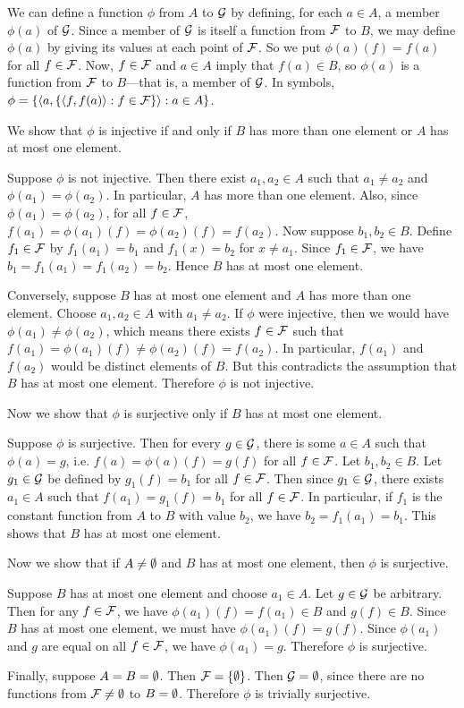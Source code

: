 \begin{solution}
We can define a function $\phi$ from $A$ to $\mathcal{G}$ by defining, for each $a\in A$,
a member $\phi(a)$ of $\mathcal{G}$. Since a member of $\mathcal{G}$ is itself a function from $\mathcal{F}$
to $B$, we may define $\phi(a)$ by giving its values at each point of $\mathcal{F}$.
So we put $\phi(a)(f) = f(a)$ for all $f\in \mathcal{F}$. Now, $f\in\mathcal{F}$
and $a\in A$ imply that $f(a)\in B$, so $\phi(a)$ is a function from $\mathcal{F}$ to $B$---that is, a member of $\mathcal{G}$.
In symbols, $\phi = \left\{ \left\langle a, \left\{ \left\langle f, f(a)\right\rangle : f\in \mathcal{F} \right\}\right\rangle : a\in A \right\}$.

We show that $\phi$ is injective if and only if $B$ has more than one element or $A$ has at most one element.

Suppose $\phi$ is not injective. Then there exist $a_1,a_2\in A$ such that $a_1\neq a_2$ and
$\phi(a_1)= \phi(a_2)$. In particular, $A$ has more than one element.
Also, since $\phi(a_1)= \phi(a_2)$, for all $f\in\mathcal{F}$, $f(a_1)=\phi(a_1)(f)=\phi(a_2)(f)=f(a_2)$.
Now suppose $b_1,b_2\in B$. Define $f_1\in\mathcal{F}$ by $f_1(a_1)=b_1$ and $f_1(x)=b_2$ for $x\neq a_1$.
Since $f_1\in\mathcal{F}$, we have $b_1=f_1(a_1)=f_1(a_2)=b_2$. Hence $B$ has at most one element.

Conversely, suppose $B$ has at most one element and $A$ has more than one element.
Choose $a_1,a_2\in A$ with $a_1\neq a_2$.
If $\phi$ were injective, then we would have $\phi(a_1)\neq\phi(a_2)$, which means
there exists $f\in\mathcal{F}$ such that $f(a_1)=\phi(a_1)(f)\neq\phi(a_2)(f)=f(a_2)$.
In particular, $f(a_1)$ and $f(a_2)$ would be distinct elements of $B$.
But this contradicts the assumption that $B$ has at most one element. Therefore $\phi$ is not injective.

Now we show that $\phi$ is surjective only if $B$ has at most one element.

Suppose $\phi$ is surjective. Then for every $g\in \mathcal{G}$, there is some $a\in A$
such that $\phi(a) = g$, i.e. $f(a)=\phi(a)(f)=g(f)$ for all $f\in\mathcal{F}$.
Let $b_1,b_2\in B$.
Let $g_1\in\mathcal{G}$ be defined by $g_1(f)=b_1$ for all $f\in\mathcal{F}$.
Then since $g_1\in\mathcal{G}$, there exists $a_1\in A$ such that $f(a_1)=g_1(f)=b_1$ for all $f\in \mathcal{F}$.
In particular, if $f_1$ is the constant function from $A$ to $B$ with value $b_2$,
we have $b_2=f_1(a_1)=b_1$. This shows that $B$ has at most one element.

Now we show that if $A\neq\emptyset$ and $B$ has at most one element, then $\phi$ is surjective.

Suppose $B$ has at most one element and choose $a_1\in A$. Let $g\in\mathcal{G}$ be arbitrary.
Then for any $f\in\mathcal{F}$, we have $\phi(a_1)(f)=f(a_1)\in B$ and $g(f)\in B$.
Since $B$ has at most one element, we must have $\phi(a_1)(f)=g(f)$.
Since $\phi(a_1)$ and $g$ are equal on all $f\in\mathcal{F}$, we have $\phi(a_1)=g$.
Therefore $\phi$ is surjective.

Finally, suppose $A=B=\emptyset$.
Then $\mathcal{F}=\left\{\emptyset\right\}$.
Then $\mathcal{G}=\emptyset$, since there are no functions from $\mathcal{F}\neq\emptyset$ to $B=\emptyset$.
Therefore $\phi$ is trivially surjective.
\end{solution}

